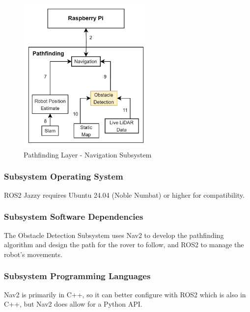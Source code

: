 \begin{figure}[h!]
	\centering
 	\includegraphics[width=0.60\textwidth]{images/pathfinding/obstacledetection.jpg}
 \caption{Pathfinding Layer - Navigation Subsystem}
\end{figure}

\subsubsection{Subsystem Operating System}
ROS2 Jazzy requires Ubuntu 24.04 (Noble Numbat) or higher for compatibility.
\subsubsection{Subsystem Software Dependencies}
The Obstacle Detection Subsystem uses Nav2 to develop the pathfinding algorithm and design the path for the rover to follow, and ROS2 to manage the robot's movements.

\subsubsection{Subsystem Programming Languages}
Nav2 is primarily in C++, so it can better configure with ROS2 which is also in C++, but Nav2 does allow for a Python API.

